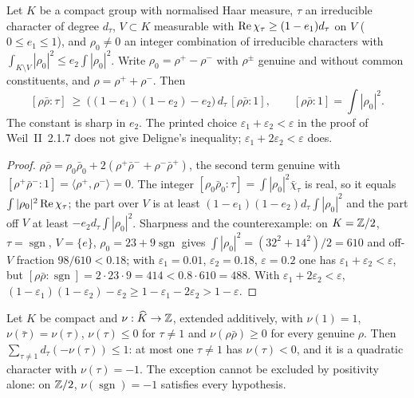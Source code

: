\begin{lemma}\label{lem:concentration}
Let $K$ be a compact group with normalised Haar measure, $\tau$ an irreducible character of degree $d_\tau$, $V\subset K$ measurable with $\operatorname{Re}\chi_\tau\ge(1-e_1)d_\tau$ on $V$ ($0\le e_1\le1$), and $\rho_0\ne0$ an integer combination of irreducible characters with $\int_{K\setminus V}|\rho_0|^2\le e_2\int|\rho_0|^2$. Write $\rho_0=\rho^+-\rho^-$ with $\rho^\pm$ genuine and without common constituents, and $\rho=\rho^++\rho^-$. Then
\[
[\rho\bar\rho:\tau]\ \ge\ \big((1-e_1)(1-e_2)-e_2\big)\,d_\tau\,[\rho\bar\rho:1],\qquad[\rho\bar\rho:1]=\int|\rho_0|^2 .
\]
The constant is sharp in $e_2$. The printed choice $\varepsilon_1+\varepsilon_2<\varepsilon$ in the proof of Weil~II~2.1.7 does not give Deligne's inequality; $\varepsilon_1+2\varepsilon_2<\varepsilon$ does.
\end{lemma}

\begin{proof}
$\rho\bar\rho=\rho_0\bar\rho_0+2(\rho^+\bar\rho^-+\rho^-\bar\rho^+)$, the second term genuine with $[\rho^+\bar\rho^-:1]=\langle\rho^+,\rho^-\rangle=0$. The integer $[\rho_0\bar\rho_0:\tau]=\int|\rho_0|^2\bar\chi_\tau$ is real, so it equals $\int|\rho_0|^2\operatorname{Re}\chi_\tau$; the part over $V$ is at least $(1-e_1)(1-e_2)d_\tau\int|\rho_0|^2$ and the part off $V$ at least $-e_2d_\tau\int|\rho_0|^2$.
Sharpness and the counterexample: on $K=\mathbb{Z}/2$, $\tau=\operatorname{sgn}$, $V=\{e\}$, $\rho_0=23+9\operatorname{sgn}$ gives $\int|\rho_0|^2=(32^2+14^2)/2=610$ and off-$V$ fraction $98/610<0.18$; with $\varepsilon_1=0.01$, $\varepsilon_2=0.18$, $\varepsilon=0.2$ one has $\varepsilon_1+\varepsilon_2<\varepsilon$, but $[\rho\bar\rho:\operatorname{sgn}]=2\cdot23\cdot9=414<0.8\cdot610=488$. With $\varepsilon_1+2\varepsilon_2<\varepsilon$, $(1-\varepsilon_1)(1-\varepsilon_2)-\varepsilon_2\ge1-\varepsilon_1-2\varepsilon_2>1-\varepsilon$.
\end{proof}

\begin{lemma}\label{lem:intpos}
Let $K$ be compact and $\nu:\widehat K\to\mathbb{Z}$, extended additively, with $\nu(1)=1$, $\nu(\bar\tau)=\nu(\tau)$, $\nu(\tau)\le0$ for $\tau\ne1$ and $\nu(\rho\bar\rho)\ge0$ for every genuine $\rho$. Then $\sum_{\tau\ne1}d_\tau(-\nu(\tau))\le1$: at most one $\tau\ne1$ has $\nu(\tau)<0$, and it is a quadratic character with $\nu(\tau)=-1$. The exception cannot be excluded by positivity alone: on $\mathbb{Z}/2$, $\nu(\operatorname{sgn})=-1$ satisfies every hypothesis.
\end{lemma}

